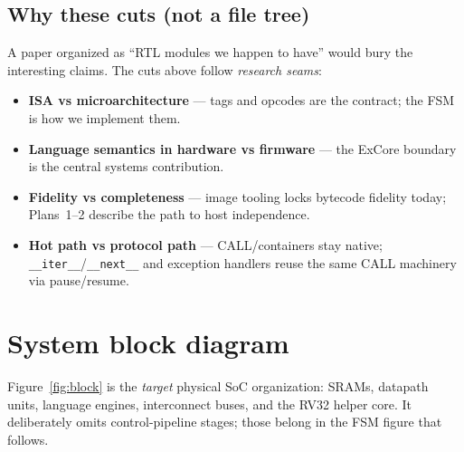 \documentclass[11pt,a4paper]{article}
\begin{document}
\subsection{Why these cuts (not a file tree)}

A paper organized as ``RTL modules we happen to have'' would bury the
interesting claims.
The cuts above follow \emph{research seams}:

\begin{itemize}[leftmargin=1.2em,itemsep=0.25em]
  \item \textbf{ISA vs microarchitecture} --- tags and opcodes are the contract;
        the FSM is how we implement them.
  \item \textbf{Language semantics in hardware vs firmware} --- the ExCore
        boundary is the central systems contribution.
  \item \textbf{Fidelity vs completeness} --- image tooling locks bytecode
        fidelity today; Plans~1--2 describe the path to host independence.
  \item \textbf{Hot path vs protocol path} --- CALL/containers stay native;
        \texttt{\_\_iter\_\_}/\texttt{\_\_next\_\_} and exception handlers reuse
        the same CALL machinery via pause/resume.
\end{itemize}

\section{System block diagram}

Figure~\ref{fig:block} is the \emph{target} physical SoC organization:
SRAMs, datapath units, language engines, interconnect buses, and the RV32
helper core.
It deliberately omits control-pipeline stages; those belong in the FSM figure
that follows.
\end{document}
